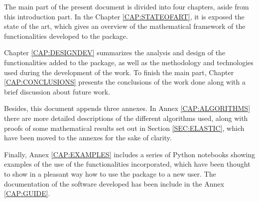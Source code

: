The main part of the present document is divided into four chapters, aside from
this introduction part. In the Chapter \ref{CAP:STATEOFART}, it is exposed the
state of the art, which gives an overview of the mathematical framework of the
functionalities developed to the package.

Chapter \ref{CAP:DESIGNDEV} summarizes the analysis and design of the
functionalities added to the package, as well as the methodology and
technologies used during the development of the work. To finish the main part,
Chapter \ref{CAP:CONCLUSIONS} presents the conclusions of the work done along
with a brief discussion about future work.

Besides, this document appends three annexes. In Annex \ref{CAP:ALGORITHMS} there are
more detailed descriptions of the different algorithms used, along with proofs of
some mathematical results set out
in Section \ref{SEC:ELASTIC}, which have been moved to the annexes for the
sake of clarity.

Finally, Annex \ref{CAP:EXAMPLES} includes a series of Python notebooks showing
examples of the use of the functionalities incorporated, which have been thought
to show in a pleasant way how to use the package to a new user. The
documentation of the software developed has been include in the
Annex \ref{CAP:GUIDE}.
